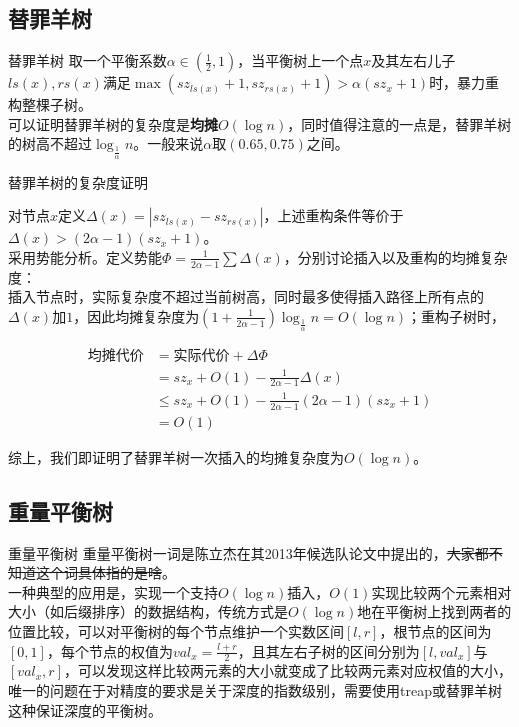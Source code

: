 \documentclass{beamer}
\begin{document}
\subsection{替罪羊树}
\begin{frame}{替罪羊树}
取一个平衡系数$\alpha \in(\frac 12,1)$，当平衡树上一个点$x$及其左右儿子$ls(x),rs(x)$满足$\max(sz_{ls(x)} + 1,sz_{rs(x)} + 1) > \alpha (sz_x + 1)$时，暴力重构整棵子树。\\

可以证明替罪羊树的复杂度是\textbf{均摊}$O(\log n)$，同时值得注意的一点是，替罪羊树的树高不超过$\log_{\frac{1}{\alpha}}n$。一般来说$\alpha$取$(0.65,0.75)$之间。

\end{frame}
\begin{frame}{替罪羊树的复杂度证明}

对节点$x$定义$\Delta(x)=|sz_{ls(x)}-sz_{rs(x)}|$，上述重构条件等价于$\Delta(x) > (2\alpha-1)(sz_x + 1)$。\\

采用势能分析。定义势能$\Phi=\frac{1}{2\alpha-1}\sum \Delta(x)$，分别讨论插入以及重构的均摊复杂度：\\

插入节点时，实际复杂度不超过当前树高，同时最多使得插入路径上所有点的$\Delta(x)$加$1$，因此均摊复杂度为$(1+\frac{1}{2\alpha-1})\log_{\frac{1}{\alpha}}n=O(\log n)$；重构子树时，

$$
\begin{aligned}
\mbox{均摊代价}&=\mbox{实际代价}+\Delta\Phi\\
&=sz_x+O(1)-\frac{1}{2\alpha-1}\Delta(x)\\
&\le sz_x+O(1)-\frac{1}{2\alpha-1}(2\alpha-1)(sz_x+1)\\
&=O(1)
\end{aligned}
$$

综上，我们即证明了替罪羊树一次插入的均摊复杂度为$O(\log n)$。

\end{frame}

\subsection{重量平衡树}
\begin{frame}{重量平衡树}
	重量平衡树一词是陈立杰在其2013年候选队论文中提出的，\sout{大家都不知道这个词具体指的是啥}。\\

	一种典型的应用是，实现一个支持$O(\log n)$插入，$O(1)$实现比较两个元素相对大小（如后缀排序）的数据结构，传统方式是$O(\log n)$地在平衡树上找到两者的位置比较，可以对平衡树的每个节点维护一个实数区间$[l,r] $，根节点的区间为$[0,1]$，每个节点的权值为$val_x=\frac{l+r}{2}$，且其左右子树的区间分别为$[l,val_x]$与$[val_x,r]$，可以发现这样比较两元素的大小就变成了比较两元素对应权值的大小，唯一的问题在于对精度的要求是关于深度的指数级别，需要使用treap或替罪羊树这种保证深度的平衡树。
\end{frame}
\end{document}
